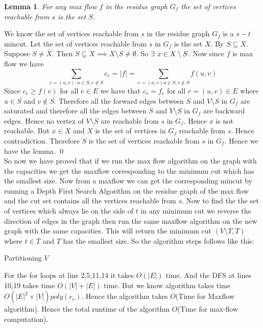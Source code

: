 \documentclass[a4paper, 11pt]{article}
\newtheorem{lemma}{Lemma}
\renewenvironment{proof}{\noindent{\it \textbf{Proof:}}\hspace*{1em}}{\qed\bigskip\\}
\begin{document}
{\begin{lemma}
	For any max flow $f$ in the residue graph $G_f$ the set of vertices reachable from $s$ is the set $S$.
\end{lemma}
\begin{proof}
	We know the set of vertices reachable from $s$ in the residue graph $G_f$ is a $s-t$ mincut. Let the set of vertices reachable from $s$ in $G_f$ is the set $X$. By  $S\subseteq X$. Suppose $S\neq X$. Then $S\subsetneq X\implies X\setminus S\neq \emptyset$. So $\exists\ x\in X\setminus S$.  Now since $f$ is max flow we have $$\sum_{e=(u,v):u\in S,v\notin S}c_e=|f|=\sum_{e=(u,v)u\in S,v\notin S}f(u,v)$$Since $c_e\geq f(e)$ for all $e\in E$ we have that $c_e=f_e$ for all $r=(u,v)\in E$ where $u\in S$ and $v\notin S$. Therefore all the forward edges between $S$ and $V\setminus S$ in $G_f$ are saturated and therefore all the edges between $S$ and $V\setminus S$ in $G_f$ are backward edges. Hence no vertex of $V\setminus S$ are reachable from $s$ in $G_f$. Hence $x$ is not reachable. But $x\in X$ and $X$ is the set of vertices in $G_f$ reachable from $s$. Hence contradiction. Therefore $S$ is the set of vertices reachable from $s$ in $G_f$. Hence we have the lemma.
\end{proof}
So now we have proved that if we run the max flow algorithm on the graph with the capacities we get the maxflow corresponding to the minimum cut which has the smallest size. Now from a maxflow we can get the corresponding mincut by running a Depth First Search Algorithm on the residue graph of the max flow and the cut set contains all the vertices reachable from $s$. Now to find the the set of vertices which always lie on the side of $t$ in any minimum cut we reverse the direction of edges in the graph then run the same maxflow algorithm on the new graph with  the same capacities. This will return the minimum cut $(V\setminus T, T)$ where $t\in T$ and $T$ has the smallest size. So the algorithm steps follows like this:
\begin{algorithm}
	\DontPrintSemicolon
\caption{Partitioning $V$}
\end{algorithm}

For the for loops at line 2,5,11,14 it takes $O(|E|)$ time. And the DFS at lines 10,19 takes time $O(|V|+|E|)$ time. But we know  algorithm takes time $O(|E|^2\times |V|)\textit{poly}(c_e)$. Hence the algorithm takes $O$(Time for Maxflow algorithm). Hence the total runtime of the algorithm $O$(Time for max-flow computation).
}\parinf
\end{document}
